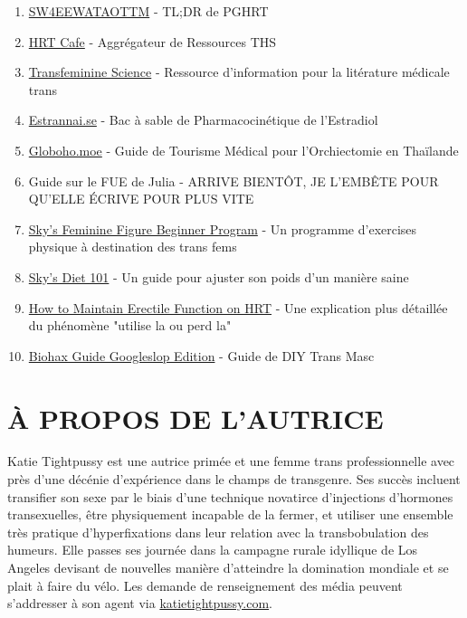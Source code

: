 \documentclass{article}
\begin{document}
\begin{enumerate}
  \item \href{https://startwith4mgestradiolenanthateweeklyandtestatonetothreemonths.com/}{SW4EEWATAOTTM} - TL;DR de PGHRT
  \item \href{https://hrtcafe.net/}{HRT Cafe} - Aggrégateur de Ressources THS
  \item \href{https://transfemscience.org/}{Transfeminine Science} - Ressource d'information pour la litérature médicale trans
  \item \href{http://estrannai.se}{Estrannai.se} - Bac à sable de Pharmacocinétique de l'Estradiol
  \item \href{https://globoho.moe/}{Globoho.moe} - Guide de Tourisme Médical pour l'Orchiectomie en Thaïlande
  \item Guide sur le FUE de Julia - ARRIVE BIENTÔT, JE L'EMBÊTE POUR QU'ELLE ÉCRIVE POUR PLUS VITE
  \item \href{https://docs.google.com/document/d/1-NyE5EY5TTaRRMhk7HlTbKJ7HifjEsA4jlDO1qKQVl0/edit?tab=t.0}{Sky's Feminine Figure Beginner Program} - Un programme d'exercises physique à destination des trans fems
  \item \href{https://docs.google.com/document/d/114sztSw1aVWM2pXLDl9NrHklyvewz3EmFiHiisjM71k/edit?tab=t.0}{Sky's Diet 101} - Un guide pour ajuster son poids d'un manière saine
  \item \href{https://stainedglasswoman.substack.com/p/how-to-maintain-your-penis-function}{How to Maintain Erectile Function on HRT} - Une explication plus détaillée du phénomène "utilise la ou perd la"
  \item \href{hhttps://docs.google.com/document/d/1DXFxzN0XTudPZez_SO61fpqncRLPH_Be_QG_8Pcz9LU/edit?pli=1&tab=t.0}{Biohax Guide Googleslop Edition} - Guide de DIY Trans Masc
\end{enumerate}

\section*{À PROPOS DE L'AUTRICE}

Katie Tightpussy est une autrice primée et une femme trans professionnelle avec près d'une décénie d'expérience dans le champs de transgenre. Ses succès incluent transifier son sexe par le biais d'une technique novatirce d'injections d'hormones transexuelles, être physiquement incapable de la fermer, et utiliser une ensemble très pratique d'hyperfixations dans leur relation avec la transbobulation des humeurs. Elle passes ses journée dans la campagne rurale idyllique de Los Angeles devisant de nouvelles manière d'atteindre la domination mondiale et se plait à faire du vélo. Les demande de renseignement des média peuvent s'addresser à son agent via \href{http://katietightpussy.com}{katietightpussy.com}. 
\end{document}
